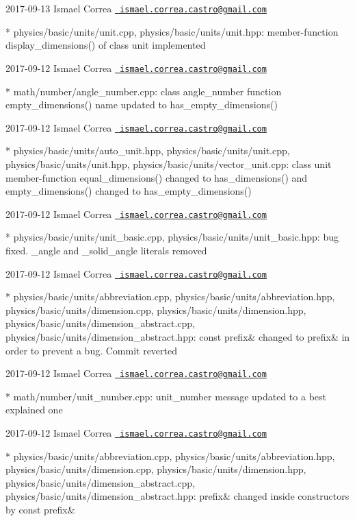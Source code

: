  2017-\/09-\/13 Ismael Correa \href{mailto:ismael.correa.castro@gmail.com}{\texttt{ ismael.\+correa.\+castro@gmail.\+com}} \begin{DoxyVerb}* physics/basic/units/unit.cpp, physics/basic/units/unit.hpp: 
member-function display_dimensions() of class unit implemented
\end{DoxyVerb}
 2017-\/09-\/12 Ismael Correa \href{mailto:ismael.correa.castro@gmail.com}{\texttt{ ismael.\+correa.\+castro@gmail.\+com}} \begin{DoxyVerb}* math/number/angle_number.cpp: class angle_number function
empty_dimensions() name updated to has_empty_dimensions()
\end{DoxyVerb}
 2017-\/09-\/12 Ismael Correa \href{mailto:ismael.correa.castro@gmail.com}{\texttt{ ismael.\+correa.\+castro@gmail.\+com}} \begin{DoxyVerb}* physics/basic/units/auto_unit.hpp, physics/basic/units/unit.cpp,
physics/basic/units/unit.hpp, physics/basic/units/vector_unit.cpp: 
class unit member-function equal_dimensions() changed to
has_dimensions() and empty_dimensions() changed to
has_empty_dimensions()
\end{DoxyVerb}
 2017-\/09-\/12 Ismael Correa \href{mailto:ismael.correa.castro@gmail.com}{\texttt{ ismael.\+correa.\+castro@gmail.\+com}} \begin{DoxyVerb}* physics/basic/units/unit_basic.cpp,
physics/basic/units/unit_basic.hpp: bug fixed. _angle and
_solid_angle literals removed
\end{DoxyVerb}
 2017-\/09-\/12 Ismael Correa \href{mailto:ismael.correa.castro@gmail.com}{\texttt{ ismael.\+correa.\+castro@gmail.\+com}} \begin{DoxyVerb}* physics/basic/units/abbreviation.cpp,
physics/basic/units/abbreviation.hpp,
physics/basic/units/dimension.cpp,
physics/basic/units/dimension.hpp,
physics/basic/units/dimension_abstract.cpp,
physics/basic/units/dimension_abstract.hpp: const prefix& changed to
prefix& in order to prevent a bug. Commit reverted
\end{DoxyVerb}
 2017-\/09-\/12 Ismael Correa \href{mailto:ismael.correa.castro@gmail.com}{\texttt{ ismael.\+correa.\+castro@gmail.\+com}} \begin{DoxyVerb}* math/number/unit_number.cpp: unit_number message updated to a best
explained one
\end{DoxyVerb}
 2017-\/09-\/12 Ismael Correa \href{mailto:ismael.correa.castro@gmail.com}{\texttt{ ismael.\+correa.\+castro@gmail.\+com}} \begin{DoxyVerb}* physics/basic/units/abbreviation.cpp,
physics/basic/units/abbreviation.hpp,
physics/basic/units/dimension.cpp,
physics/basic/units/dimension.hpp,
physics/basic/units/dimension_abstract.cpp,
physics/basic/units/dimension_abstract.hpp: prefix& changed inside
constructors by const prefix&
\end{DoxyVerb}
